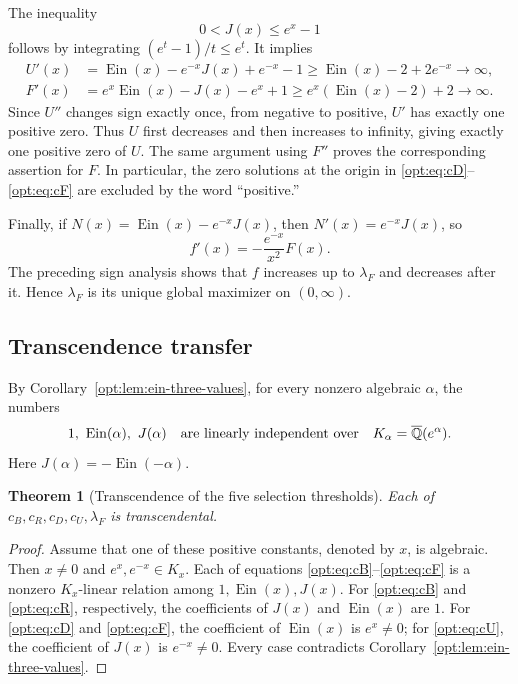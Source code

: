 \documentclass[11pt,a4paper]{article}
\DeclareMathOperator{\Ein}{Ein}
\newtheorem{theorem}{Theorem}[section]
\theoremstyle{definition}
\theoremstyle{remark}
\numberwithin{equation}{section}
\begin{document}
The inequality
\[
 0<J(x)\le e^x-1
\]
follows by integrating $(e^t-1)/t\le e^t$.
It implies
\begin{align*}
 U'(x)&=\Ein(x)-e^{-x}J(x)+e^{-x}-1
       \ge \Ein(x)-2+2e^{-x}\longrightarrow\infty,\\
 F'(x)&=e^x\Ein(x)-J(x)-e^x+1
       \ge e^x(\Ein(x)-2)+2\longrightarrow\infty.
\end{align*}
Since $U''$ changes sign exactly once, from negative to positive,
$U'$ has exactly one positive zero. Thus $U$ first decreases and then
increases to infinity, giving exactly one positive zero of $U$.
The same argument using $F''$ proves the corresponding assertion for $F$.
In particular, the zero solutions at the origin in
\eqref{opt:eq:cD}--\eqref{opt:eq:cF} are excluded by the word ``positive.''

Finally, if $N(x)=\Ein(x)-e^{-x}J(x)$, then
$N'(x)=e^{-x}J(x)$, so
\[
       f'(x)=-\frac{e^{-x}}{x^2}F(x).
\]
The preceding sign analysis shows that $f$ increases up to $\lambda_F$
and decreases after it. Hence $\lambda_F$ is its unique global maximizer
on $(0,\infty)$.

\subsection{Transcendence transfer}

By Corollary~\ref{opt:lem:ein-three-values}, for every nonzero
algebraic $\alpha$, the numbers
\[
 1,\ \Ein(\alpha),\ J(\alpha)
 \quad\hbox{are linearly independent over}\quad
 K_\alpha=\overline{\mathbb Q}(e^\alpha).
\]
Here $J(\alpha)=-\Ein(-\alpha)$.

\begin{theorem}[Transcendence of the five selection thresholds]\label{opt:selection-transcendence}
Each of $c_B,c_R,c_D,c_U,\lambda_F$ is transcendental.
\end{theorem}
\begin{proof}
Assume that one of these positive constants, denoted by $x$, is
algebraic. Then $x\ne0$ and $e^x,e^{-x}\in K_x$.
Each of equations \eqref{opt:eq:cB}--\eqref{opt:eq:cF} is a nonzero
$K_x$-linear relation among $1,\Ein(x),J(x)$.
For \eqref{opt:eq:cB} and \eqref{opt:eq:cR}, respectively, the coefficients
of $J(x)$ and $\Ein(x)$ are $1$.
For \eqref{opt:eq:cD} and \eqref{opt:eq:cF}, the coefficient of $\Ein(x)$ is
$e^x\ne0$; for \eqref{opt:eq:cU}, the coefficient of $J(x)$ is
$e^{-x}\ne0$.
Every case contradicts Corollary~\ref{opt:lem:ein-three-values}.
\end{proof}
\end{document}
